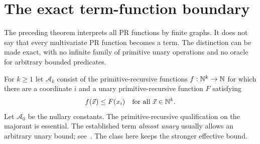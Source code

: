 \section{The exact term-function boundary}
\label{sec:exact-boundary}

The preceding theorem interprets all PR functions by finite graphs. It does not say that every multivariate PR function becomes a term. The distinction can be made exact, with no infinite family of primitive unary operations and no oracle for arbitrary bounded predicates.

For $k\geq1$ let $\mathcal A_k$ consist of the primitive-recursive functions $f:\mathbb N^k\to\mathbb N$ for which there are a coordinate $i$ and a unary primitive-recursive function $F$ satisfying
\[
                         f(\vec x)\leq F(x_i)
                  \quad\text{for all }\vec x\in\mathbb N^k.
\]
Let $\mathcal A_0$ be the nullary constants. The primitive-recursive qualification on the majorant is essential. The established term \emph{almost unary} usually allows an arbitrary unary bound; see~\cite{pinsker}. The class here keeps the stronger effective bound.

